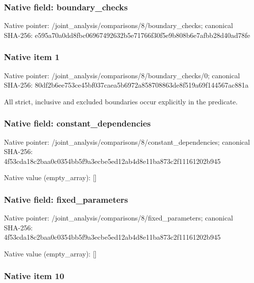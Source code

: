 \documentclass[10pt,a4paper]{article}
\begin{document}
\subsubsection{Native field: boundary\_checks}


Native pointer: /joint\_analysis/comparis\allowbreak{}ons/8/boundary\_checks; canonical SHA-256: e595a70a0dd8fbc069674926\allowbreak{}32b5e71766f30f5e9b808b6e\allowbreak{}7afbb28d40ad78fe



\subsubsection{Native item 1}


Native pointer: /joint\_analysis/comparis\allowbreak{}ons/8/boundary\_checks/0; canonical SHA-256: 80df2b6ee753ce45bf037cae\allowbreak{}a5b6972a858708863de8f519\allowbreak{}a69f144567ac881a


All strict, inclusive and excluded boundaries occur explicitly in the predicate.


\subsubsection{Native field: constant\_dependencies}


Native pointer: /joint\_analysis/comparis\allowbreak{}ons/8/constant\_dependenc\allowbreak{}ies; canonical SHA-256: 4f53cda18c2baa0c0354bb5f\allowbreak{}9a3ecbe5ed12ab4d8e11ba87\allowbreak{}3c2f11161202b945



Native value (empty\_array): []



\subsubsection{Native field: fixed\_parameters}


Native pointer: /joint\_analysis/comparis\allowbreak{}ons/8/fixed\_parameters; canonical SHA-256: 4f53cda18c2baa0c0354bb5f\allowbreak{}9a3ecbe5ed12ab4d8e11ba87\allowbreak{}3c2f11161202b945



Native value (empty\_array): []



\subsubsection{Native item 10}
\end{document}
